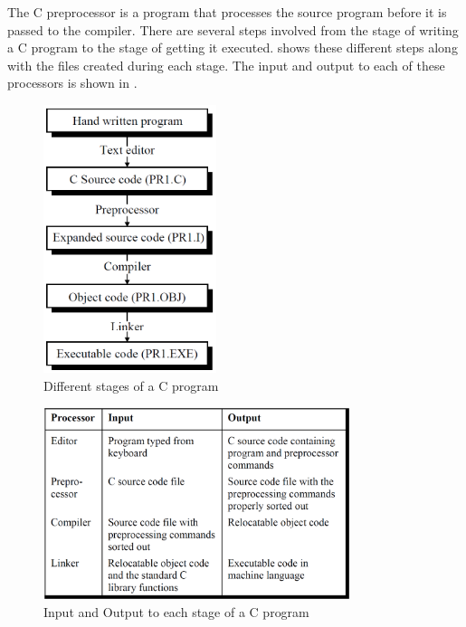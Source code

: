 The C preprocessor is a program that processes the source program before it is passed to the compiler. There are several steps involved from the stage of writing a C program to the stage of getting it executed.  shows these different steps along with the files created during each stage. The input and output to each of these processors is shown in .

\begin{figure}[H]
    \begin{center}
        \includegraphics[width=0.45\textwidth]{images/CCodingSteps.PNG}
        \caption{Different stages of a C program}
        \label{CCodingSteps}
    \end{center}
\end{figure}


\begin{figure}[H]
    \begin{center}
        \includegraphics[width=0.8\textwidth]{images/CCodingStepsIO.PNG}
        \caption{Input and Output to each stage of a C program}
        \label{CCodingStepsIO}
    \end{center}
\end{figure}

